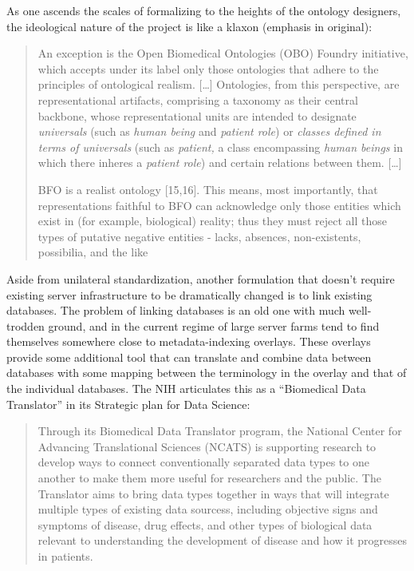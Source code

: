 \documentclass[10pt]{tufte-book}
\begin{document}
As one ascends the scales of formalizing to the heights of the ontology
designers, the ideological nature of the project is like a klaxon
(emphasis in original):

\begin{quote}
An exception is the Open Biomedical Ontologies (OBO) Foundry initiative,
which accepts under its label only those ontologies that adhere to the
principles of ontological realism. {[}\ldots{]} Ontologies, from this
perspective, are representational artifacts, comprising a taxonomy as
their central backbone, whose representational units are intended to
designate \emph{universals} (such as \emph{human being} and
\emph{patient role}) or \emph{classes defined in terms of universals}
(such as \emph{patient,} a class encompassing \emph{human beings} in
which there inheres a \emph{patient role}) and certain relations between
them. {[}\ldots{]}

BFO is a realist ontology {[}15,16{]}. This means, most importantly,
that representations faithful to BFO can acknowledge only those entities
which exist in (for example, biological) reality; thus they must reject
all those types of putative negative entities - lacks, absences,
non-existents, possibilia, and the like \citep{ceustersFoundationsRealistOntology2010} 
\end{quote}

Aside from unilateral standardization, another formulation that doesn't
require existing server infrastructure to be dramatically changed is to
link existing databases. The problem of linking databases is an old one
with much well-trodden ground, and in the current regime of large server
farms tend to find themselves somewhere close to metadata-indexing
overlays. These overlays provide some additional tool that can translate
and combine data between databases with some mapping between the
terminology in the overlay and that of the individual databases. The NIH
articulates this as a ``Biomedical Data Translator'' in its Strategic
plan for Data Science:

\begin{quote}
Through its Biomedical Data Translator program, the National Center for
Advancing Translational Sciences (NCATS) is supporting research to
develop ways to connect conventionally separated data types to one
another to make them more useful for researchers and the public. The
Translator aims to bring data types together in ways that will integrate
multiple types of existing data sourcess, including objective signs and
symptoms of disease, drug effects, and other types of biological data
relevant to understanding the development of disease and how it
progresses in patients. \citep{NIHStrategicPlan2018} 
\end{quote}
\end{document}
